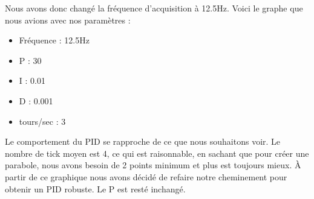 \documentclass[
	a4paper,									%
	11pt,										%
	twoside,									%
	openright,									%
	notitlepage,									%
	parskip=half,								%
]{scrreprt}										%
\begin{document}
Nous avons donc changé la fréquence d'acquisition à 12.5Hz. Voici le graphe que nous avions avec nos paramètres : 

\begin{center}
    

    
    
    \begin{itemize}
        \item Fréquence : 12.5Hz
        \item P : 30
        \item I : 0.01
        \item D : 0.001
        \item tours/sec : 3
    \end{itemize}
    \end{center}

Le comportement du PID se rapproche de ce que nous souhaitons voir. Le nombre de tick moyen est 4, ce qui est raisonnable, 
en sachant que pour créer une parabole, nous avons besoin de 2 points minimum et plus est toujours mieux. À partir de ce 
graphique nous avons décidé de refaire notre cheminement pour obtenir un PID robuste. Le P est resté inchangé. \par
\end{document}
